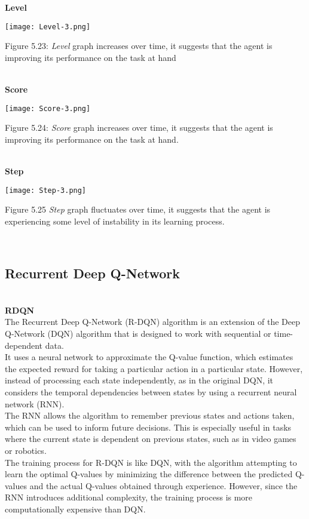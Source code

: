 \documentclass[conference]{IEEEtran}
\begin{document}
\textbf{Level}\\

\graphicspath{ {./images/} }
\texttt{[image: Level-3.png]}
\caption{Figure 5.23: \textit{Level} graph increases over time, it suggests that the agent is improving its performance on the task at hand
}\\

\textbf{Score}\\

\graphicspath{ {./images/} }
\texttt{[image: Score-3.png]}
\caption{Figure 5.24: \textit{Score }graph increases over time, it suggests that the agent is improving its performance on the task at hand.
}\\

\textbf{Step}\\

\graphicspath{ {./images/} }
\texttt{[image: Step-3.png]}
\caption{Figure 5.25 \textit{Step }graph fluctuates over time, it suggests that the agent is experiencing some level of instability in its learning process.
}\\

\subsection{Recurrent Deep Q-Network}\\

\textbf{RDQN}\\

The Recurrent Deep Q-Network (R-DQN) algorithm is an extension of the Deep Q-Network (DQN) algorithm that is designed to work with sequential or time-dependent data.\\
It uses a neural network to approximate the Q-value function, which estimates the expected reward for taking a particular action in a particular state. However, instead of processing each state independently, as in the original DQN, it considers the temporal dependencies between states by using a recurrent neural network (RNN).\\
The RNN allows the algorithm to remember previous states and actions taken, which can be used to inform future decisions. This is especially useful in tasks where the current state is dependent on previous states, such as in video games or robotics.\\
The training process for R-DQN is like DQN, with the algorithm attempting to learn the optimal Q-values by minimizing the difference between the predicted Q-values and the actual Q-values obtained through experience. However, since the RNN introduces additional complexity, the training process is more computationally expensive than DQN.\\
\end{document}
